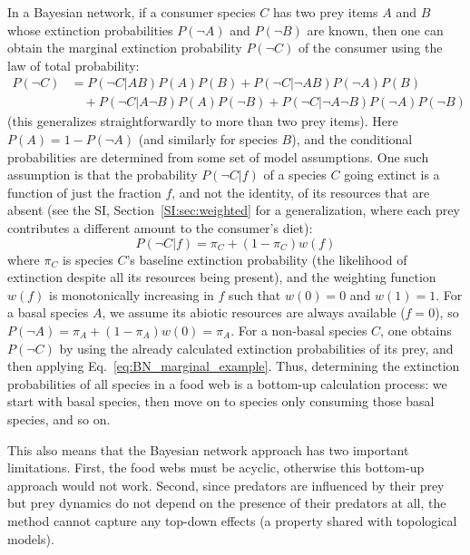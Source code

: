 \documentclass[11pt]{article}
\newcommand{\SI}{SI}
\begin{document}
\begin{mybox}[p]
\begin{mdframed}
In a Bayesian network, if a consumer species $C$ has two prey items $A$ and $B$ whose extinction probabilities $P(\neg A)$ and $P(\neg B)$ are known, then one can obtain the marginal extinction probability $P(\neg C)$ of the consumer using the law of total probability:
\begin{equation}
  \label{eq:BN_marginal_example}
  \tag{B1}
  \begin{split}
    P(\neg C) &= P(\neg C|A B)P(A)P(B) + P(\neg C|\neg A B)P(\neg A)P(B)
    \\ &\quad + P(\neg C|A \neg B)P(A)P(\neg B) + P(\neg C|\neg A \neg B)
    P(\neg A)P(\neg B)
  \end{split}
\end{equation}
(this generalizes straightforwardly to more than two prey items). Here $P(A) = 1 - P(\neg A)$ (and similarly for species $B$), and the conditional probabilities are determined from some set of model assumptions. One such assumption is that the probability $P(\neg C|f)$ of a species $C$ going extinct is a function of just the fraction $f$, and not the identity, of its resources that are absent (see the \SI, Section~\ref{SI:sec:weighted} for a generalization, where each prey contributes a different amount to the consumer's diet):
\begin{equation}
  \label{eq:BN_prob}
  \tag{B2}
  P(\neg C|f) = \pi_C + (1 - \pi_C) w(f)
\end{equation}
where $\pi_C$ is species $C$'s baseline extinction probability (the likelihood of extinction despite all its resources being present), and the weighting function $w(f)$ is monotonically increasing in $f$ such that $w(0)=0$ and $w(1)=1$. For a basal species $A$, we assume its abiotic resources are always available ($f=0$), so $P(\neg A) = \pi_A + (1 - \pi_A) w(0) = \pi_A$. For a non-basal species $C$, one obtains $P(\neg C)$ by using the already calculated extinction probabilities of its prey, and then applying Eq.~\ref{eq:BN_marginal_example}. Thus, determining the extinction probabilities of all species in a food web is a bottom-up calculation process: we start with basal species, then move on to species only consuming those basal species, and so on.

This also means that the Bayesian network approach has two important limitations. First, the food webs must be acyclic, otherwise this bottom-up approach would not work. Second, since predators are influenced by their prey but prey dynamics do not depend on the presence of their predators at all, the method cannot capture any top-down effects (a property shared with topological models).

\end{mdframed}
\end{mybox}
\end{document}
